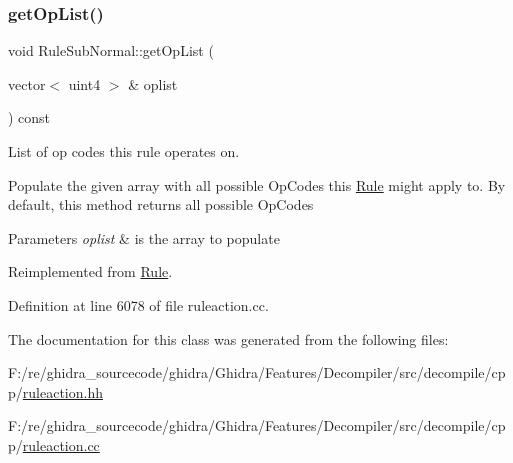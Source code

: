 \subsubsection{\texorpdfstring{getOpList()}{getOpList()}}
{\footnotesize\ttfamily void Rule\+Sub\+Normal\+::get\+Op\+List (\begin{DoxyParamCaption}\item[{vector$<$ uint4 $>$ \&}]{oplist }\end{DoxyParamCaption}) const\hspace{0.3cm}{\ttfamily [virtual]}}



List of op codes this rule operates on. 

Populate the given array with all possible Op\+Codes this \mbox{\hyperlink{class_rule}{Rule}} might apply to. By default, this method returns all possible Op\+Codes 
\begin{DoxyParams}{Parameters}
{\em oplist} & is the array to populate \\
\hline
\end{DoxyParams}


Reimplemented from \mbox{\hyperlink{class_rule_a4023bfc7825de0ab866790551856d10e}{Rule}}.



Definition at line 6078 of file ruleaction.\+cc.



The documentation for this class was generated from the following files\+:\begin{DoxyCompactItemize}
\item 
F\+:/re/ghidra\+\_\+sourcecode/ghidra/\+Ghidra/\+Features/\+Decompiler/src/decompile/cpp/\mbox{\hyperlink{ruleaction_8hh}{ruleaction.\+hh}}\item 
F\+:/re/ghidra\+\_\+sourcecode/ghidra/\+Ghidra/\+Features/\+Decompiler/src/decompile/cpp/\mbox{\hyperlink{ruleaction_8cc}{ruleaction.\+cc}}\end{DoxyCompactItemize}
